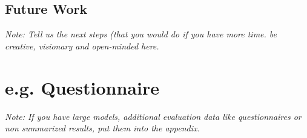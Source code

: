 \documentclass[a4paper,12pt,twoside]{report}
\begin{document}
\section{Future Work}

\textit{Note: Tell us the next steps  (that you would do if you have more time. be creative, visionary and open-minded here.}



\appendix

\chapter{e.g. Questionnaire}

\textit{Note: If you have large models, additional evaluation data like questionnaires or non summarized results, put them into the appendix.}


\clearpage

\listoffigures
\clearpage

\listoftables
\clearpage



\end{document}
